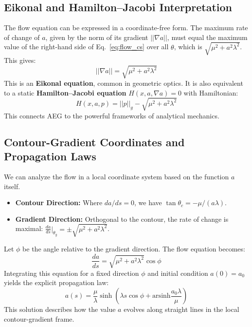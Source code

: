 \documentclass[12pt]{article}
\begin{document}
\subsection{Eikonal and Hamilton–Jacobi Interpretation}

The flow equation can be expressed in a coordinate-free form. The maximum rate of change of \( a \), given by the norm of its gradient \( ||\nabla a|| \), must equal the maximum value of the right-hand side of Eq.~\eqref{eq:flow_cs} over all \( \theta \), which is \( \sqrt{\mu^2 + a^2 \lambda^2} \). This gives:
\begin{equation}\label{eq:coordinate_free_cs}
||\nabla a|| = \sqrt{\mu^2 + a^2 \lambda^2}
\end{equation}
This is an \textbf{Eikonal equation}, common in geometric optics. It is also equivalent to a static \textbf{Hamilton–Jacobi equation} \( H(x, a, \nabla a) = 0 \) with Hamiltonian:
\begin{equation}\label{eq:hamiltonian_cs}
    H(x, a, p) = ||p||_g - \sqrt{\mu^2 + a^2 \lambda^2}
\end{equation}
This connects AEG to the powerful frameworks of analytical mechanics.

\subsection{Contour-Gradient Coordinates and Propagation Laws}

We can analyze the flow in a local coordinate system based on the function \( a \) itself.
\begin{itemize}
    \item \textbf{Contour Direction:} Where \( da/ds = 0 \), we have \( \tan \theta_c = - \mu / (a \lambda) \).
    \item \textbf{Gradient Direction:} Orthogonal to the contour, the rate of change is maximal: \( \frac{da}{ds}\big|_{\theta_g} = \pm \sqrt{\mu^2 + a^2 \lambda^2} \).
\end{itemize}
Let \( \phi \) be the angle relative to the gradient direction. The flow equation becomes:
\begin{equation}
    \frac{da}{ds} = \sqrt {\mu^2 + a^2 \lambda^2} \cos \phi \label{eq:contourgradient_cs}
\end{equation}
Integrating this equation for a fixed direction \( \phi \) and initial condition \( a(0)=a_0 \) yields the explicit propagation law:
\begin{equation}
    a(s) = \frac{\mu}{\lambda} \sinh\left(\lambda s \cos \phi + \mathrm{arsinh} \frac{a_0 \lambda}{\mu}\right) \label{eq:gradevo_initial_cs}
\end{equation}
This solution describes how the value \( a \) evolves along straight lines in the local contour-gradient frame.
\end{document}
